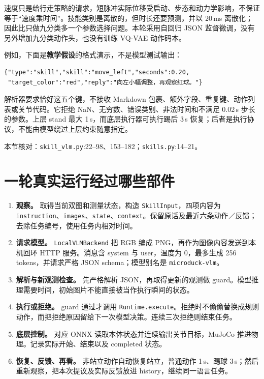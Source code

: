速度只是给行走策略的请求，短脉冲实际位移受启动、步态和动力学影响，不保证等于“速度乘时间”。技能类别是离散的，但时长还要预测，并以 20\,ms 离散化；因此比只做九分类多一个参数选择问题。本轮采用自回归 JSON 监督微调，没有另外增加九分类动作头，也没有训练 VQ-VAE 动作码本。

例如，下面是\textbf{教学假设}的格式演示，不是模型测试输出：

\begin{Verbatim}[breaklines=true,fontsize=\small]
{"type":"skill","skill":"move_left","seconds":0.20,
 "target_color":"red","reply":"向左小幅调整，再观察红球。"}
\end{Verbatim}

解析器要求恰好这五个键，不接收 Markdown 包裹、额外字段、重复键、动作列表或关节代码。它拒绝 NaN、无穷数、错误类别、非法时间和不满足 0.02\,s 步长的参数。上层 stand 最大 1\,s，而底层执行器可执行踢后 3\,s 恢复；后者是执行协议，不能由模型绕过上层约束随意指定。

本节核对：\texttt{skill\_vlm.py}:22--98、153--182；\texttt{skills.py}:14--21。

\section{一轮真实运行经过哪些部件}

\begin{enumerate}
\item \textbf{观察。} 取得当前双图和测量状态，构造 \texttt{SkillInput}，四项内容为 \texttt{instruction}、\texttt{images}、\texttt{state}、\texttt{context}。保留原话及最近六条动作／反馈；去除任务编号，使用任务内相对时间。
\item \textbf{请求模型。} \texttt{LocalVLMBackend} 把 RGB 编成 PNG，再作为图像内容发送到本机回环 HTTP 服务。消息含 system 与 user，温度为 0，最多生成 256 tokens，并请求严格 JSON schema；模型别名是 \texttt{microduck-vlm}。
\item \textbf{解析与新观测检查。} 先严格解析 JSON，再取得更新的观测做 guard。模型推理需要时间，初始图片不能直接被当作执行瞬间的状态。
\item \textbf{执行或拒绝。} guard 通过才调用 \texttt{Runtime.execute}。拒绝时不偷偷替换成规则动作，而把拒绝原因留给下一次模型决策。连续三次拒绝则结束任务。
\item \textbf{底层控制。} 对应 ONNX 读取本体状态并连续输出关节目标，MuJoCo 推进物理。记录实际开始、结束以及 completed 状态。
\item \textbf{恢复、反馈、再看。} 非站立动作自动恢复站立，普通动作 1\,s、踢球 3\,s；然后重新观察，把本次提议及实际反馈放进 history，继续同一语言任务。
\end{enumerate}

